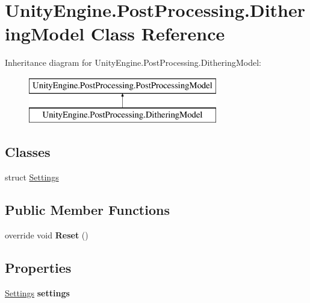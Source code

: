 \hypertarget{class_unity_engine_1_1_post_processing_1_1_dithering_model}{}\section{Unity\+Engine.\+Post\+Processing.\+Dithering\+Model Class Reference}
\label{class_unity_engine_1_1_post_processing_1_1_dithering_model}
Inheritance diagram for Unity\+Engine.\+Post\+Processing.\+Dithering\+Model\+:\begin{figure}[H]
\begin{center}
\leavevmode
\includegraphics[height=2.000000cm]{class_unity_engine_1_1_post_processing_1_1_dithering_model}
\end{center}
\end{figure}
\subsection*{Classes}
\begin{DoxyCompactItemize}
\item 
struct \hyperlink{struct_unity_engine_1_1_post_processing_1_1_dithering_model_1_1_settings}{Settings}
\end{DoxyCompactItemize}
\subsection*{Public Member Functions}
\begin{DoxyCompactItemize}
\item 
\mbox{\label{class_unity_engine_1_1_post_processing_1_1_dithering_model_a32230e9d0e5db63630764379fe5eb09e}} 
override void {\bfseries Reset} ()
\end{DoxyCompactItemize}
\subsection*{Properties}
\begin{DoxyCompactItemize}
\item 
\mbox{\label{class_unity_engine_1_1_post_processing_1_1_dithering_model_a5907987a25dc4f7f459cdafe704a0441}} 
\hyperlink{struct_unity_engine_1_1_post_processing_1_1_dithering_model_1_1_settings}{Settings} {\bfseries settings}
\end{DoxyCompactItemize}
